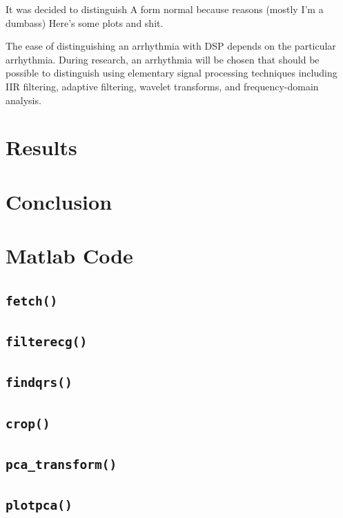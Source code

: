 \documentclass[12pt,letter]{article}
\begin{document}
It was decided to distinguish A form normal because
reasons (mostly I'm a dumbass) Here's some plots and shit.  

The ease of distinguishing an arrhythmia with DSP depends on the particular
arrhythmia.  During research, an arrhythmia will be chosen that should be
possible to distinguish using elementary signal processing techniques including
IIR filtering, adaptive filtering, wavelet transforms, and frequency-domain
analysis.  

\section{Results}

\section{Conclusion}

\appendix
\section{Matlab Code}
\subsection{\texttt{fetch()}}
\label{fun:fetch}

\subsection{\texttt{filterecg()}}
\label{fun:filter}

\subsection{\texttt{findqrs()}}
\label{fun:qrs}

\subsection{\texttt{crop()}}
\label{fun:crop}

\subsection{\texttt{pca\_transform()}}
\label{fun:pca}

\subsection{\texttt{plotpca()}}
\label{fun:plotpca}

\end{document}
